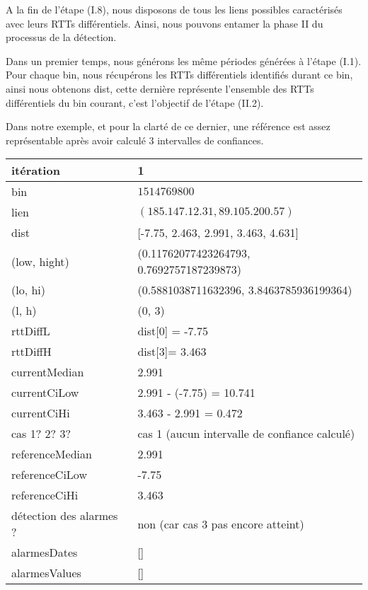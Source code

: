 A la fin de l'étape (I.8), nous disposons de tous les liens possibles caractérisés avec leurs RTTs différentiels. Ainsi, nous pouvons entamer la phase II du processus de la détection.

Dans un premier temps, nous générons les même  périodes générées à  l'étape (I.1). Pour chaque bin,  nous récupérons les RTTs différentiels identifiés durant ce bin, ainsi nous obtenons {\color{gray} dist}, cette dernière représente l'ensemble des RTTs différentiels du bin courant, c'est l'objectif de l'étape (II.2).

Dans notre exemple,  et pour la clarté de ce dernier, une référence est assez représentable après avoir calculé 3 intervalles de confiances. 
\newpage
	\begin{table}[H]
		\centering

		\begin{tabularx}{\linewidth}{|l|X| }
		\hline
itération & 1	\\ \hline
bin & $1514769800$ \\ \hline
lien & $(185.147.12.31, 89.105.200.57)$  \\ \hline
dist& [-7.75, 2.463, 2.991, 3.463, 4.631]	\\ \hline
(low, hight)& (0.11762077423264793, 0.7692757187239873) 	\\ \hline
(lo, hi)&(0.5881038711632396, 3.8463785936199364)  \\ \hline
(l, h) & (0, 3) 	\\ \hline
rttDiffL& dist[0] = -7.75	\\ \hline
rttDiffH& dist[3]= 3.463	\\ \hline
currentMedian& 2.991	\\ \hline
currentCiLow&  2.991 - (-7.75) = 10.741 	\\ \hline
currentCiHi& 3.463 - 2.991 =  0.472	\\ \hline
cas 1? 2? 3?& cas 1 (aucun intervalle de confiance calculé)  \\ \hline
referenceMedian& 2.991	\\ \hline
referenceCiLow& -7.75	\\ \hline
referenceCiHi&3.463	\\ \hline
détection des alarmes ?& non (car cas 3 pas  encore atteint)	\\ \hline
alarmesDates& []	\\ \hline
alarmesValues& []	\\ \hline
		
			
		\end{tabularx}
	\end{table}



